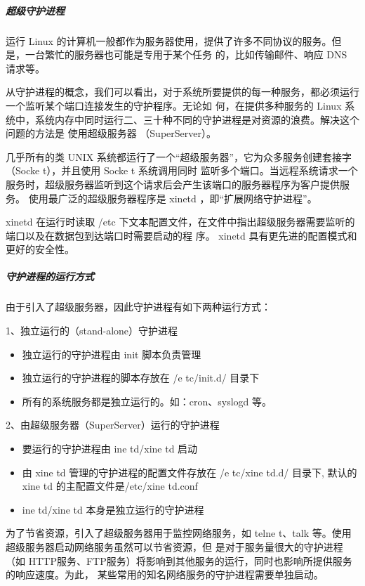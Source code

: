 \documentclass[letterpaper,10pt]{sphinxmanual}
\begin{document}
\subparagraph{超级守护进程}
\label{Linux_pro_mana/process:id12}
运行 Linux 的计算机一般都作为服务器使用，提供了许多不同协议的服务。但是，一台繁忙的服务器也可能是专用于某个任务
的，比如传输邮件、响应 DNS 请求等。

从守护进程的概念，我们可以看出，对于系统所要提供的每一种服务，都必须运行一个监听某个端口连接发生的守护程序。无论如
何，在提供多种服务的 Linux 系统中，系统内存中同时运行二、三十种不同的守护进程是对资源的浪费。解决这个问题的方法是
使用超级服务器 （SuperServer）。

几乎所有的类 UNIX 系统都运行了一个“超级服务器”，它为众多服务创建套接字（Socke t），并且使用 Socke t 系统调用同时
监听多个端口。当远程系统请求一个服务时，超级服务器监听到这个请求后会产生该端口的服务器程序为客户提供服务。
使用最广泛的超级服务器程序是 xinetd ，即“扩展网络守护进程”。

xinetd 在运行时读取 /etc 下文本配置文件，在文件中指出超级服务器需要监听的端口以及在数据包到达端口时需要启动的程
序。 xinetd 具有更先进的配置模式和更好的安全性。


\subparagraph{守护进程的运行方式}
\label{Linux_pro_mana/process:id13}
由于引入了超级服务器，因此守护进程有如下两种运行方式：

1、独立运行的（stand-alone）守护进程
\begin{itemize}
\item {} 
独立运行的守护进程由 init 脚本负责管理

\item {} 
独立运行的守护进程的脚本存放在 /e tc/init.d/ 目录下

\item {} 
所有的系统服务都是独立运行的。如：cron、syslogd 等。

\end{itemize}

2、由超级服务器（SuperServer）运行的守护进程
\begin{itemize}
\item {} 
要运行的守护进程由 ine td/xine td 启动

\item {} 
由 xine td 管理的守护进程的配置文件存放在 /e tc/xine td.d/ 目录下, 默认的 xine td 的主配置文件是/etc/xine td.conf

\item {} 
ine td/xine td 本身是独立运行的守护进程

\end{itemize}

为了节省资源，引入了超级服务器用于监控网络服务，如 telne t、talk 等。使用超级服务器启动网络服务虽然可以节省资源，但
是对于服务量很大的守护进程（如 HTTP服务、FTP服务）将影响到其他服务的运行，同时也影响所提供服务的响应速度。为此，
某些常用的知名网络服务的守护进程需要单独启动。
\end{document}
